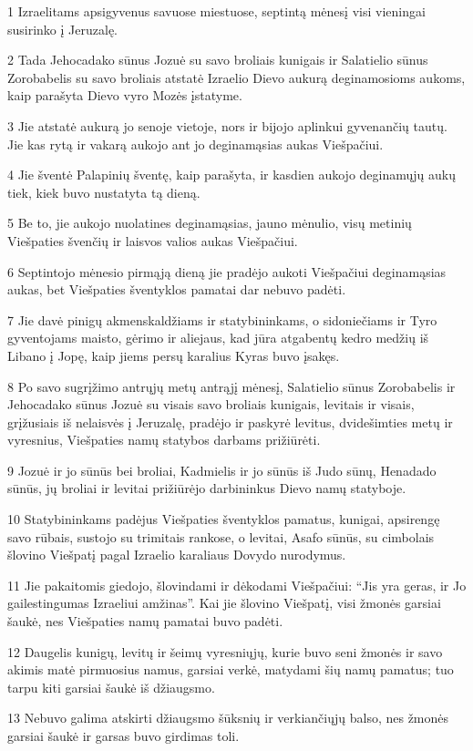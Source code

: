 \par 1 Izraelitams apsigyvenus savuose miestuose, septintą mėnesį visi vieningai susirinko į Jeruzalę. 
\par 2 Tada Jehocadako sūnus Jozuė su savo broliais kunigais ir Salatielio sūnus Zorobabelis su savo broliais atstatė Izraelio Dievo aukurą deginamosioms aukoms, kaip parašyta Dievo vyro Mozės įstatyme. 
\par 3 Jie atstatė aukurą jo senoje vietoje, nors ir bijojo aplinkui gyvenančių tautų. Jie kas rytą ir vakarą aukojo ant jo deginamąsias aukas Viešpačiui. 
\par 4 Jie šventė Palapinių šventę, kaip parašyta, ir kasdien aukojo deginamųjų aukų tiek, kiek buvo nustatyta tą dieną. 
\par 5 Be to, jie aukojo nuolatines deginamąsias, jauno mėnulio, visų metinių Viešpaties švenčių ir laisvos valios aukas Viešpačiui. 
\par 6 Septintojo mėnesio pirmąją dieną jie pradėjo aukoti Viešpačiui deginamąsias aukas, bet Viešpaties šventyklos pamatai dar nebuvo padėti. 
\par 7 Jie davė pinigų akmenskaldžiams ir statybininkams, o sidoniečiams ir Tyro gyventojams­ maisto, gėrimo ir aliejaus, kad jūra atgabentų kedro medžių iš Libano į Jopę, kaip jiems persų karalius Kyras buvo įsakęs. 
\par 8 Po savo sugrįžimo antrųjų metų antrąjį mėnesį, Salatielio sūnus Zorobabelis ir Jehocadako sūnus Jozuė su visais savo broliais kunigais, levitais ir visais, grįžusiais iš nelaisvės į Jeruzalę, pradėjo ir paskyrė levitus, dvidešimties metų ir vyresnius, Viešpaties namų statybos darbams prižiūrėti. 
\par 9 Jozuė ir jo sūnūs bei broliai, Kadmielis ir jo sūnūs iš Judo sūnų, Henadado sūnūs, jų broliai ir levitai prižiūrėjo darbininkus Dievo namų statyboje. 
\par 10 Statybininkams padėjus Viešpaties šventyklos pamatus, kunigai, apsirengę savo rūbais, sustojo su trimitais rankose, o levitai, Asafo sūnūs, su cimbolais šlovino Viešpatį pagal Izraelio karaliaus Dovydo nurodymus. 
\par 11 Jie pakaitomis giedojo, šlovindami ir dėkodami Viešpačiui: “Jis yra geras, ir Jo gailestingumas Izraeliui amžinas”. Kai jie šlovino Viešpatį, visi žmonės garsiai šaukė, nes Viešpaties namų pamatai buvo padėti. 
\par 12 Daugelis kunigų, levitų ir šeimų vyresniųjų, kurie buvo seni žmonės ir savo akimis matė pirmuosius namus, garsiai verkė, matydami šių namų pamatus; tuo tarpu kiti garsiai šaukė iš džiaugsmo. 
\par 13 Nebuvo galima atskirti džiaugsmo šūksnių ir verkiančiųjų balso, nes žmonės garsiai šaukė ir garsas buvo girdimas toli.



